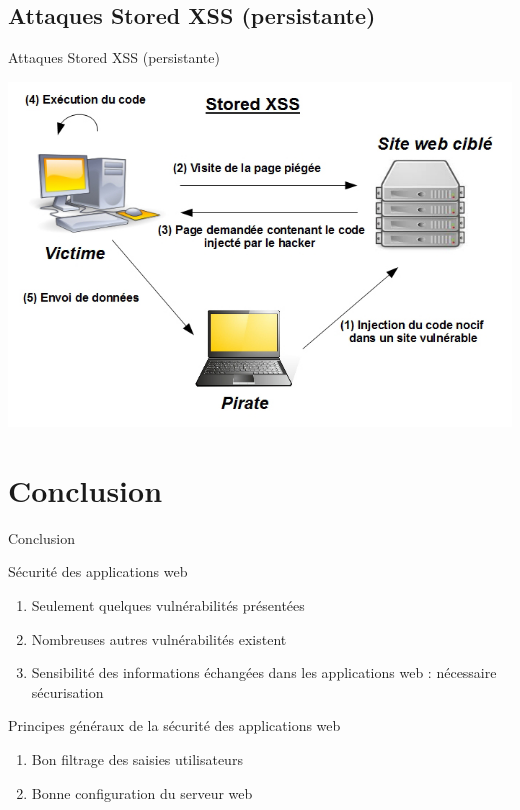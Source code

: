\documentclass[8pt]{beamer}
\begin{document}
\subsection{Attaques Stored XSS (persistante)}

\begin{frame}{Attaques Stored XSS (persistante)}

\begin{center}
	\includegraphics[scale=.42]{../images/xss/stored_xss.jpg}
\end{center}



\end{frame}

\section{Conclusion}

\begin{frame}
  \tableofcontents[sectionstyle=show/shaded,subsectionstyle=shaded]
\end{frame}

\begin{frame}{Conclusion}

\begin{block}{Sécurité des applications web}
	\begin{enumerate}[\ding{217}]
		\item Seulement quelques vulnérabilités présentées
		\item Nombreuses autres vulnérabilités existent
		\item Sensibilité des informations échangées dans les applications web : nécessaire sécurisation
	\end{enumerate}
\end{block}

\begin{block}{Principes généraux de la sécurité des applications web}
	\begin{enumerate}[\ding{217}]
		\item Bon filtrage des saisies utilisateurs
		\item Bonne configuration du serveur web
	\end{enumerate}
\end{block}

\end{frame}
	
	
\end{document}
